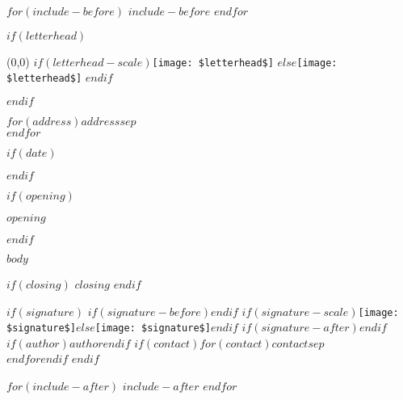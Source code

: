 \documentclass[$if(font-size)$$fontsize$$else$11pt$endif$]{letter}
\begin{document}
$for(include-before)$
$include-before$
$endfor$

$if(letterhead)$
\begin{textblock}{0}(0,0)
$if(letterhead-scale)$\texttt{[image: \$letterhead\$]}
$else$\texttt{[image: \$letterhead\$]}
$endif$
\end{textblock}
$endif$

\begin{letter}{$for(address)$$address$$sep$\\$endfor$}

$if(date)$\date{$date$}$endif$

$if(opening)$\opening{$opening$}$endif$

$body$

$if(closing)$
$closing$
$endif$

$if(signature)$
$if(signature-before)$\vspace*{$signature-before$}$endif$
$if(signature-scale)$\texttt{[image: \$signature\$]}$else$\texttt{[image: \$signature\$]}$endif$
$if(signature-after)$\vspace*{$signature-after$}$endif$
$if(author)$$author$$endif$
$if(contact)$$for(contact)$$contact$$sep$\\$endfor$$endif$
$endif$

\end{letter}

$for(include-after)$
$include-after$
$endfor$
\end{document}
